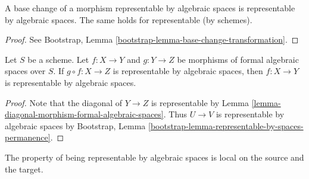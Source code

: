 \begin{lemma}
\label{lemma-base-change-representable}
A base change of a morphism representable by algebraic spaces is
representable by algebraic spaces. The same holds for representable
(by schemes).
\end{lemma}

\begin{proof}
See Bootstrap, Lemma \ref{bootstrap-lemma-base-change-transformation}.
\end{proof}

\begin{lemma}
\label{lemma-permanence-representable}
Let $S$ be a scheme. Let $f : X \to Y$ and $g : Y \to Z$ be morphisms of
formal algebraic spaces over $S$. If $g \circ f : X \to Z$ is representable
by algebraic spaces, then $f : X \to Y$ is representable by algebraic spaces.
\end{lemma}

\begin{proof}
Note that the diagonal of $Y \to Z$ is representable by
Lemma \ref{lemma-diagonal-morphism-formal-algebraic-spaces}.
Thus $U \to V$ is representable by algebraic spaces by
Bootstrap, Lemma \ref{bootstrap-lemma-representable-by-spaces-permanence}.
\end{proof}

\noindent
The property of being representable by algebraic spaces is local on the
source and the target.

